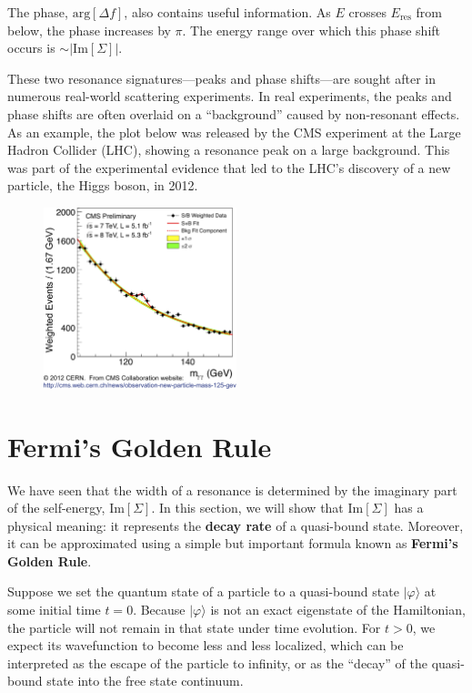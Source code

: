 \documentclass[pra,12pt]{revtex4}
\begin{document}
The phase, $\mathrm{arg}[\Delta f]$, also contains useful information.
As $E$ crosses $E_{\mathrm{res}}$ from below, the phase increases by
$\pi$.  The energy range over which this phase shift occurs is $\sim
|\mathrm{Im}[\Sigma]|$.

These two resonance signatures---peaks and phase shifts---are sought
after in numerous real-world scattering experiments.  In real
experiments, the peaks and phase shifts are often overlaid on a
``background'' caused by non-resonant effects.  As an example, the
plot below was released by the CMS experiment at the Large Hadron
Collider (LHC), showing a resonance peak on a large background.  This
was part of the experimental evidence that led to the LHC's discovery
of a new particle, the Higgs boson, in 2012.

\begin{figure}[h]
  \centering\includegraphics[width=0.5\textwidth]{higgs}
\end{figure}

\section{Fermi's Golden Rule}
\label{sec:goldenrule}

We have seen that the width of a resonance is determined by the
imaginary part of the self-energy, $\mathrm{Im}[\Sigma]$.  In this
section, we will show that $\mathrm{Im}[\Sigma]$ has a physical
meaning: it represents the \textbf{decay rate} of a quasi-bound state.
Moreover, it can be approximated using a simple but important formula
known as \textbf{Fermi's Golden Rule}.

Suppose we set the quantum state of a particle to a quasi-bound state
$|\varphi\rangle$ at some initial time $t = 0$.  Because
$|\varphi\rangle$ is not an exact eigenstate of the Hamiltonian, the
particle will not remain in that state under time evolution.  For $t >
0$, we expect its wavefunction to become less and less localized,
which can be interpreted as the escape of the particle to infinity, or
as the ``decay'' of the quasi-bound state into the free state
continuum.
\end{document}
